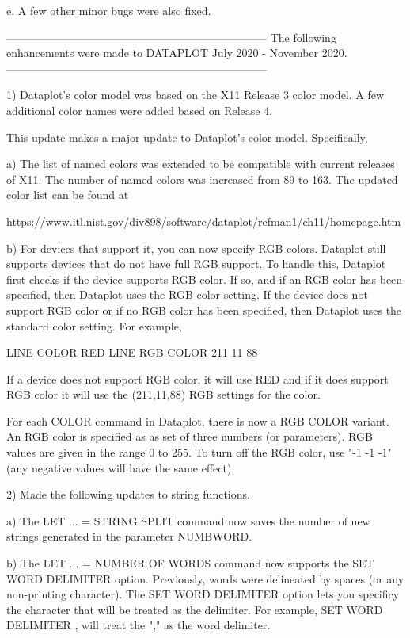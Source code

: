     e. A few other minor bugs were also fixed.

-----------------------------------------------------------------------
The following enhancements were made to DATAPLOT
July 2020 - November 2020.
-----------------------------------------------------------------------

 1) Dataplot's color model was based on the X11 Release 3 color
    model.  A few additional color names were added based on
    Release 4.

    This update makes a major update to Dataplot's color model.
    Specifically,

    a) The list of named colors was extended to be compatible
       with current releases of X11.  The number of named colors
       was increased from 89 to 163.  The updated color list can
       be found at

          https://www.itl.nist.gov/div898/software/dataplot/refman1/ch11/homepage.htm

    b) For devices that support it, you can now specify RGB colors.
       Dataplot still supports devices that do not have full RGB
       support.  To handle this, Dataplot first checks if the
       device supports RGB color.  If so, and if an RGB color has
       been specified, then Dataplot uses the RGB color setting.
       If the device does not support RGB color or if no RGB color
       has been specified, then Dataplot uses the standard color
       setting.  For example,

           LINE COLOR RED
           LINE RGB COLOR 211 11 88

       If a device does not support RGB color, it will use RED and
       if it does support RGB color it will use the (211,11,88)
       RGB settings for the color.

       For each COLOR command in Dataplot, there is now a
       RGB COLOR variant.  An RGB color is specified as as set
       of three numbers (or parameters).  RGB values are given
       in the range 0 to 255.  To turn off the RGB color, use
       "-1 -1 -1" (any negative values will have the same effect).

 2) Made the following updates to string functions.

    a) The LET ... = STRING SPLIT command now saves the number of new
       strings generated in the parameter NUMBWORD.

    b) The LET ... = NUMBER OF WORDS command now supports the 
       SET WORD DELIMITER option.  Previously, words were delineated by
       spaces (or any non-printing character).  The SET WORD DELIMITER
       option lets you specificy the character that will be treated as
       the delimiter.  For example, SET WORD DELIMITER , will treat
       the "," as the word delimiter.

